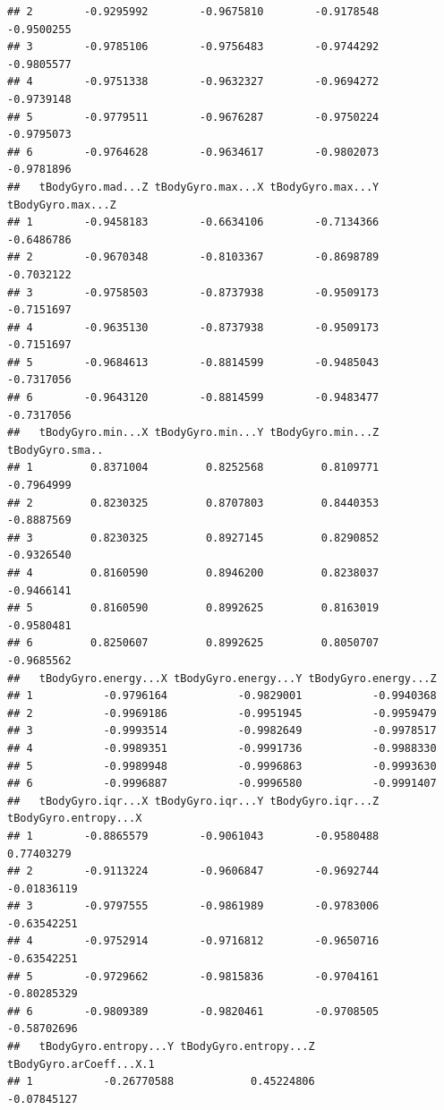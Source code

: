 \documentclass[
]{article}
\begin{document}
\begin{verbatim}
## 2        -0.9295992        -0.9675810        -0.9178548        -0.9500255
## 3        -0.9785106        -0.9756483        -0.9744292        -0.9805577
## 4        -0.9751338        -0.9632327        -0.9694272        -0.9739148
## 5        -0.9779511        -0.9676287        -0.9750224        -0.9795073
## 6        -0.9764628        -0.9634617        -0.9802073        -0.9781896
##   tBodyGyro.mad...Z tBodyGyro.max...X tBodyGyro.max...Y tBodyGyro.max...Z
## 1        -0.9458183        -0.6634106        -0.7134366        -0.6486786
## 2        -0.9670348        -0.8103367        -0.8698789        -0.7032122
## 3        -0.9758503        -0.8737938        -0.9509173        -0.7151697
## 4        -0.9635130        -0.8737938        -0.9509173        -0.7151697
## 5        -0.9684613        -0.8814599        -0.9485043        -0.7317056
## 6        -0.9643120        -0.8814599        -0.9483477        -0.7317056
##   tBodyGyro.min...X tBodyGyro.min...Y tBodyGyro.min...Z tBodyGyro.sma..
## 1         0.8371004         0.8252568         0.8109771      -0.7964999
## 2         0.8230325         0.8707803         0.8440353      -0.8887569
## 3         0.8230325         0.8927145         0.8290852      -0.9326540
## 4         0.8160590         0.8946200         0.8238037      -0.9466141
## 5         0.8160590         0.8992625         0.8163019      -0.9580481
## 6         0.8250607         0.8992625         0.8050707      -0.9685562
##   tBodyGyro.energy...X tBodyGyro.energy...Y tBodyGyro.energy...Z
## 1           -0.9796164           -0.9829001           -0.9940368
## 2           -0.9969186           -0.9951945           -0.9959479
## 3           -0.9993514           -0.9982649           -0.9978517
## 4           -0.9989351           -0.9991736           -0.9988330
## 5           -0.9989948           -0.9996863           -0.9993630
## 6           -0.9996887           -0.9996580           -0.9991407
##   tBodyGyro.iqr...X tBodyGyro.iqr...Y tBodyGyro.iqr...Z tBodyGyro.entropy...X
## 1        -0.8865579        -0.9061043        -0.9580488            0.77403279
## 2        -0.9113224        -0.9606847        -0.9692744           -0.01836119
## 3        -0.9797555        -0.9861989        -0.9783006           -0.63542251
## 4        -0.9752914        -0.9716812        -0.9650716           -0.63542251
## 5        -0.9729662        -0.9815836        -0.9704161           -0.80285329
## 6        -0.9809389        -0.9820461        -0.9708505           -0.58702696
##   tBodyGyro.entropy...Y tBodyGyro.entropy...Z tBodyGyro.arCoeff...X.1
## 1           -0.26770588            0.45224806             -0.07845127

\end{verbatim}
\end{document}
